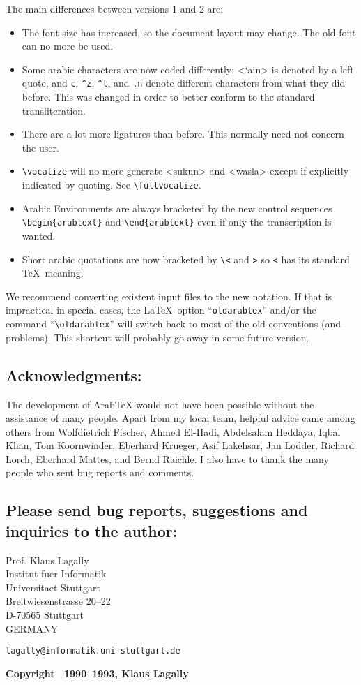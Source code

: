 \documentclass[pagesize=auto]{scrartcl}
\makeatletter
\newcommand*{\ArabTeX}{Arab\kern-0.12em\TeX\@\xspace}
\newcommand*{\symb}[1]{\textsf{\textlangle#1\textrangle}}
\def\ArabTeX{ArabTeX\xspace}%
\def\symb#1{<#1>}%
\makeatother
\begin{document}
The main differences between versions 1 and 2 are:
%
\begin{itemize}
\item The font size has increased, so the document layout may change. The old 
  font can no more be used.
\item Some arabic characters are now coded differently: \symb{`ain} is denoted by a 
  left quote, and \verb+c+, \verb+^z+, \verb+^t+, and \verb+.n+ denote different characters 
  from what they did before. This was changed in order to better conform 
  to the standard transliteration. 
\item There are a lot more ligatures than before. This normally need not 
  concern the user.
\item \verb+\vocalize+ will no more generate \symb{sukun} and \symb{wasla} except if explicitly 
  indicated by quoting. See \verb+\fullvocalize+.
\item Arabic Environments are always bracketed by the new control sequences\\ 
  \verb+\begin{arabtext}+ and \verb+\end{arabtext}+ even if only the transcription is 
  wanted. 
\item Short arabic quotations are now bracketed by \verb+\<+ and \verb+>+ so \verb+<+ has its 
  standard \TeX\ meaning. 
\end{itemize}

We recommend converting existent input files to the new notation. If that 
is impractical in special cases, the \LaTeX\ option ``\texttt{oldarabtex}'' and/or the 
command ``\verb+\oldarabtex+'' will switch back to most of the old conventions (and 
problems). This shortcut will probably go away in some future version. 


\subsection{Acknowledgments:}

The development of \ArabTeX would not have been possible without the 
assistance of many people. Apart from my local team, helpful advice came 
among others from Wolfdietrich Fischer, Ahmed El-Hadi, Abdelsalam Heddaya, 
Iqbal Khan, Tom Koornwinder, Eberhard Krueger, Asif Lakehsar, Jan Lodder, 
Richard Lorch, Eberhard Mattes, and Bernd Raichle. I also have to thank 
the many people who sent bug reports and comments.


\subsection{Please send bug reports, suggestions and inquiries to the author:}

\noindent
Prof. Klaus Lagally\\
Institut fuer Informatik\\
Universitaet Stuttgart\\
Breitwiesenstrasse 20--22\\
D-70565 Stuttgart \\
GERMANY

\medskip
\noindent
\texttt{lagally@informatik.uni-stuttgart.de}

\bigskip
\noindent
\textbf{Copyright \textcopyright\ 1990--1993, Klaus Lagally}
\end{document}
